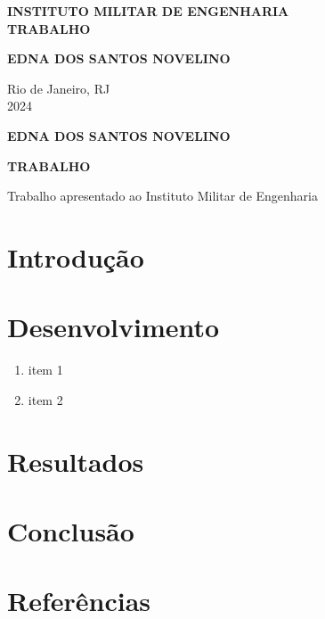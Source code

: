 \documentclass[a4paper,12pt]{article}
\begin{document}
\thispagestyle{empty}
\begin{center}

\Large \textbf {INSTITUTO MILITAR DE ENGENHARIA} \\

\vspace{4 cm}
\Large \textbf {TRABALHO}

\vspace{5 cm}
\Large \textbf{EDNA DOS SANTOS NOVELINO}

\vspace{10 cm}
Rio de Janeiro, RJ \\
2024

\end{center}


\newpage

\thispagestyle{empty}

\begin{center}
\Large \textbf {EDNA DOS SANTOS NOVELINO}

\vspace{3 cm}
\Large \textbf {TRABALHO}
\end{center}

\vspace{3 cm}
\hfill \parbox {8 cm} {Trabalho apresentado ao Instituto Militar de Engenharia } %

\vspace{4 cm}


\newpage
\begin{abstract}
    
\end{abstract}


\newpage
\begin{flushleft}
\section{Introdução}

\newpage
\section{Desenvolvimento}
\begin{enumerate} %
\item item 1
\item item 2
\end{enumerate}

\newpage
\section{Resultados}

\newpage
\section{Conclusão}

\end{flushleft} 

\newpage
\section{Referências}
\end{document}

